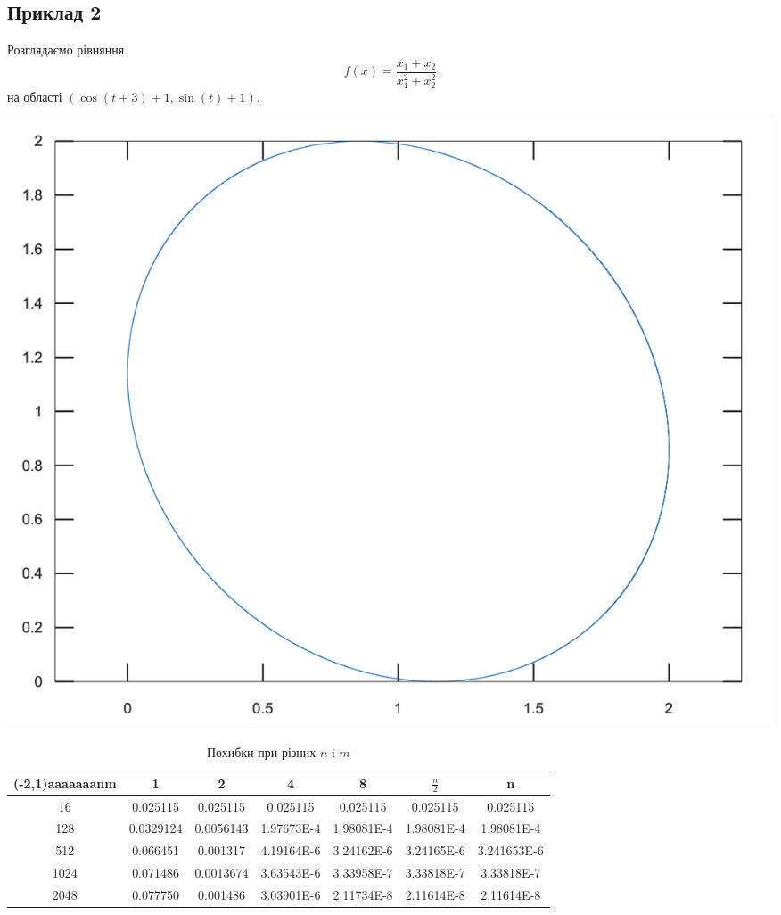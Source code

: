 \documentclass[12pt]{report}
\begin{document}
	\subsection{Приклад 2}
	\hspace{0.8cm}Розглядаємо рівняння
	$$f(x)=\frac{x_1+x_2}{x_1^2+x_2^2}$$ 
	на області $(\cos(t+3)+1, \sin(t)+1)$.
	\begin{center}
	\includegraphics[scale=0.5]{2_4}
	\end{center}
	\begin{table}[ht]
		\centering 
		\begin{tabular}{c c c c c c c} %
			\hline\hline %
			
			\diaghead(-2,1){aaaaaaa}{n}{m} & 1 & 2 & 4 & 8& $\frac{n}{2}$ & n \\ [0.25ex] %
			\hline %
			16 & 0.025115& 0.025115 & 0.025115& 0.025115& 0.025115& 0.025115  \\ %
			128 & 0.0329124& 0.0056143 & 1.97673E-4&1.98081E-4 &1.98081E-4&1.98081E-4\\
			512 &0.066451 & 0.001317& 4.19164E-6 &3.24162E-6&3.24165E-6&3.241653E-6\\
			1024 & 0.071486& 0.0013674& 3.63543E-6& 3.33958E-7 &3.33818E-7&3.33818E-7\\
			2048 & 0.077750& 0.001486& 3.03901E-6&2.11734E-8 &2.11614E-8&2.11614E-8
			\\ [0.5ex] %
			\hline %
		\end{tabular}
		\caption{Похибки при різних $n$ i $m$}
		\label{table:nonlin} %
	\end{table}
\end{document}

